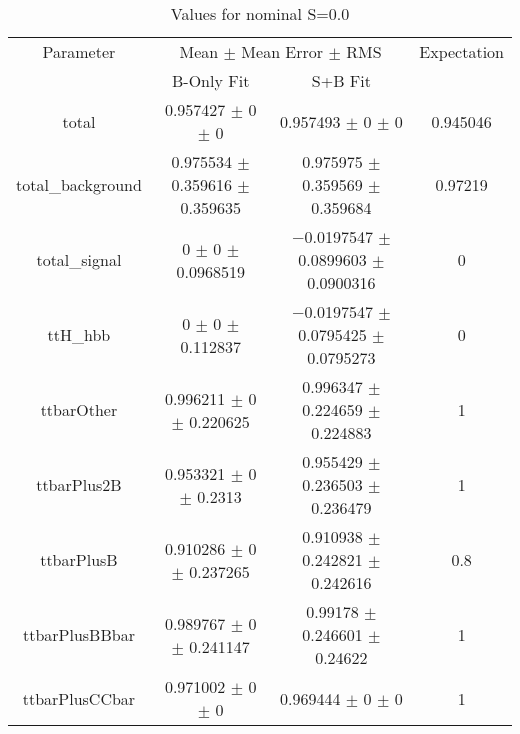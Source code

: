 \begin{table}
\centering
\caption{Values for nominal S=0.0}
\begin{tabular}{cccc}
\toprule
Parameter & \multicolumn{2}{c}{Mean $\pm$ Mean Error $\pm$ RMS} & Expectation\\
 & B-Only Fit & S+B Fit & \\
\midrule
total & \num{0.957427} $\pm$ \num{0} $\pm$ \num{0} & \num{0.957493} $\pm$ \num{0} $\pm$ \num{0} & \num{0.945046}\\
total\_background & \num{0.975534} $\pm$ \num{0.359616} $\pm$ \num{0.359635} & \num{0.975975} $\pm$ \num{0.359569} $\pm$ \num{0.359684} & \num{0.97219}\\
total\_signal & \num{0} $\pm$ \num{0} $\pm$ \num{0.0968519} & \num{-0.0197547} $\pm$ \num{0.0899603} $\pm$ \num{0.0900316} & \num{0}\\
ttH\_hbb & \num{0} $\pm$ \num{0} $\pm$ \num{0.112837} & \num{-0.0197547} $\pm$ \num{0.0795425} $\pm$ \num{0.0795273} & \num{0}\\
ttbarOther & \num{0.996211} $\pm$ \num{0} $\pm$ \num{0.220625} & \num{0.996347} $\pm$ \num{0.224659} $\pm$ \num{0.224883} & \num{1}\\
ttbarPlus2B & \num{0.953321} $\pm$ \num{0} $\pm$ \num{0.2313} & \num{0.955429} $\pm$ \num{0.236503} $\pm$ \num{0.236479} & \num{1}\\
ttbarPlusB & \num{0.910286} $\pm$ \num{0} $\pm$ \num{0.237265} & \num{0.910938} $\pm$ \num{0.242821} $\pm$ \num{0.242616} & \num{0.8}\\
ttbarPlusBBbar & \num{0.989767} $\pm$ \num{0} $\pm$ \num{0.241147} & \num{0.99178} $\pm$ \num{0.246601} $\pm$ \num{0.24622} & \num{1}\\
ttbarPlusCCbar & \num{0.971002} $\pm$ \num{0} $\pm$ \num{0} & \num{0.969444} $\pm$ \num{0} $\pm$ \num{0} & \num{1}\\
\bottomrule
\end{tabular}
\end{table}